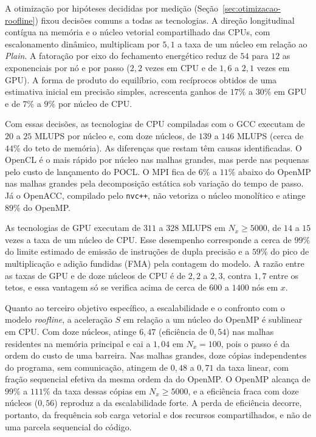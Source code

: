 A otimização por hipóteses decididas por medição (Seção~\ref{sec:otimizacao-roofline}) fixou decisões comuns a todas as tecnologias.
A direção longitudinal contígua na memória e o núcleo vetorial compartilhado das CPUs, com escalonamento dinâmico, multiplicam por \(5{,}1\) a taxa de um núcleo em relação ao \textit{Plain}.
A fatoração por eixo do fechamento energético reduz de \(54\) para \(12\) as exponenciais por nó e por passo (\(2{,}2\) vezes em CPU e de \(1{,}6\) a \(2{,}1\) vezes em GPU).
A forma de produto do equilíbrio, com recíprocos obtidos de uma estimativa inicial em precisão simples, acrescenta ganhos de \(17\%\) a \(30\%\) em GPU e de \(7\%\) a \(9\%\) por núcleo de CPU.

Com essas decisões, as tecnologias de CPU compiladas com o GCC executam de \(20\) a \(25\) MLUPS por núcleo e, com doze núcleos, de \(139\) a \(146\) MLUPS (cerca de \(44\%\) do teto de memória).
As diferenças que restam têm causas identificadas.
O OpenCL é o mais rápido por núcleo nas malhas grandes, mas perde nas pequenas pelo custo de lançamento do POCL.
O MPI fica de \(6\%\) a \(11\%\) abaixo do OpenMP nas malhas grandes pela decomposição estática sob variação do tempo de passo.
Já o OpenACC, compilado pelo \texttt{nvc++}, não vetoriza o núcleo monolítico e atinge \(89\%\) do OpenMP.

As tecnologias de GPU executam de \(311\) a \(328\) MLUPS em \(N_x \geq 5000\), de \(14\) a \(15\) vezes a taxa de um núcleo de CPU.
Esse desempenho corresponde a cerca de \(99\%\) do limite estimado de emissão de instruções de dupla precisão e a \(59\%\) do pico de multiplicação e adição fundidas (FMA) pela contagem do modelo.
A razão entre as taxas de GPU e de doze núcleos de CPU é de \(2{,}2\) a \(2{,}3\), contra \(1{,}7\) entre os tetos, e essa vantagem só se verifica acima de cerca de \(600\) a \(1400\) nós em \(x\).

Quanto ao terceiro objetivo específico, a escalabilidade e o confronto com o modelo \textit{roofline}, a aceleração \(S\) em relação a um núcleo do OpenMP é sublinear em CPU.
Com doze núcleos, atinge \(6{,}47\) (eficiência de \(0{,}54\)) nas malhas residentes na memória principal e cai a \(1{,}04\) em \(N_x = 100\), pois o passo é da ordem do custo de uma barreira.
Nas malhas grandes, doze cópias independentes do programa, sem comunicação, atingem de \(0{,}48\) a \(0{,}71\) da taxa linear, com fração sequencial efetiva da mesma ordem da do OpenMP.
O OpenMP alcança de \(99\%\) a \(111\%\) da taxa dessas cópias em \(N_x \geq 5000\), e a eficiência fraca com doze núcleos (\(0{,}56\)) reproduz a da escalabilidade forte.
A perda de eficiência decorre, portanto, da frequência sob carga vetorial e dos recursos compartilhados, e não de uma parcela sequencial do código.

